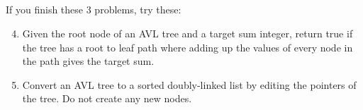\documentclass{article}
\begin{document}
\subsection*{}

If you finish these 3 problems, try these:

\begin{enumerate}


\setcounter{enumi}{3}

\item Given the root node of an AVL tree and a target sum integer, return true if the tree has a root to leaf path where adding up the values of every node in the path gives the target sum.


\item Convert an AVL tree to a sorted doubly-linked list by editing the pointers of the tree.  Do not create any new nodes.


\end{enumerate}

\clearpage

\end{document}
